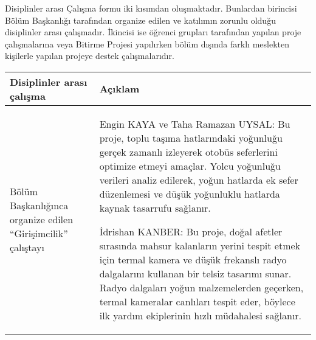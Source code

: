 Disiplinler arası Çalışma formu iki kısımdan oluşmaktadır. Bunlardan birincisi Bölüm Başkanlığı tarafından organize edilen ve katılımın zorunlu olduğu disiplinler arası çalışmadır. İkincisi ise öğrenci grupları tarafından yapılan proje çalışmalarına veya Bitirme Projesi yapılırken bölüm dışında farklı meslekten kişilerle yapılan projeye destek çalışmalarıdır.


\begin{table}[H]
\centering
\begin{tabular}{|p{7cm}|p{7cm}|}
\hline
  Disiplinler arası çalışma &
  Açıklam \\ \hline
  Bölüm Başkanlığınca organize edilen “Girişimcilik” çalıştayı &
  
  Engin KAYA ve Taha Ramazan UYSAL: Bu proje, toplu taşıma hatlarındaki yoğunluğu gerçek zamanlı izleyerek otobüs seferlerini optimize etmeyi amaçlar. Yolcu yoğunluğu verileri analiz edilerek, yoğun hatlarda ek sefer düzenlemesi ve düşük yoğunluklu hatlarda kaynak tasarrufu sağlanır.

  İdrishan KANBER: Bu proje, doğal afetler sırasında mahsur kalanların yerini tespit etmek için termal kamera ve düşük frekanslı radyo dalgalarını kullanan bir telsiz tasarımı sunar. Radyo dalgaları yoğun malzemelerden geçerken, termal kameralar canlıları tespit eder, böylece ilk yardım ekiplerinin hızlı müdahalesi sağlanır.
  
  \\ \hline
\end{tabular}
\end{table}